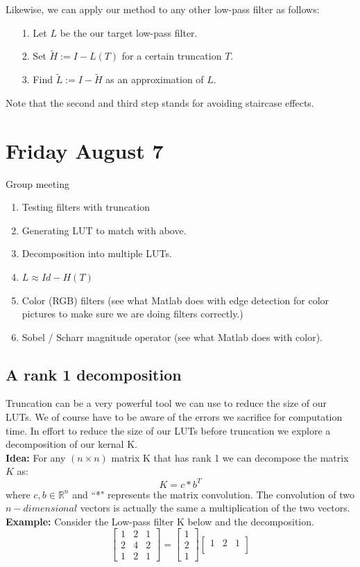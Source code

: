 \documentclass[12pt]{amsart}
\theoremstyle{definition}
\theoremstyle{remark}
\numberwithin{thm}{section}
\begin{document}
Likewise, we can apply our method to any other low-pass filter as follows:

\begin{itemize}
\item[1.] Let $L$ be the our target low-pass filter.
\item[2.] Set $\tilde{H}:=I-L(T)$ for a certain truncation $T$.
\item[3.] Find $\tilde{L}:=I-\tilde{H}$ as an approximation of $L$.
\end{itemize}

Note that the second and third step stands for avoiding staircase effects.
\section{Friday August 7}

Group meeting
\begin{enumerate}
\item Testing filters with truncation
\item Generating LUT to match with above.
\item Decomposition into multiple LUTs.
\item $L \approx Id - H(T)$
\item Color (RGB) filters (see what Matlab does with edge detection for color pictures to make sure we are doing filters correctly.)
\item Sobel / Scharr magnitude operator (see what Matlab does with color).
\end{enumerate}

\subsection{A rank 1 decomposition}
Truncation can be a very powerful tool we can use to reduce the size of our LUTs. We of course have to be aware of the errors we sacrifice for computation time. In effort to reduce the size of our LUTs before truncation we explore a decomposition of our kernal K.
\\
\textbf{Idea:}
For any $(n\times n)$ matrix K that has rank 1 we can decompose the matrix $K$ as:
$$K=c*b^T$$
where $c,b \in \mathbb{R}^n$ and ``*" represents the matrix convolution. The convolution of two $n-dimensional$ vectors is actually the same a multiplication of the two vectors. 
\\
\textbf{Example:}
Consider the 
Low-pass filter K below and the decomposition.
$$
\begin{bmatrix}
1 & 2 & 1\\
2 & 4 & 2\\
1 & 2 & 1
\end{bmatrix}
=
\begin{bmatrix}
 1\\
 2\\
 1
\end{bmatrix}
\begin{bmatrix}
1 & 2 & 1\\
\end{bmatrix}
$$
\end{document}
